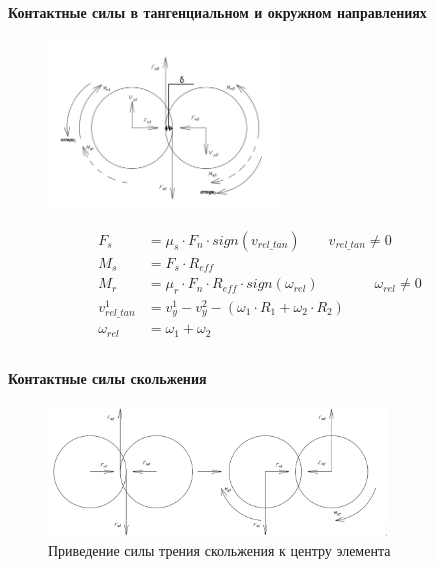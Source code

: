 \documentclass[c]{beamer}  %
\begin{document}
\begin{frame}
\frametitle{\insertsection} 
\framesubtitle{Контактные силы в тангенциальном и окружном направлениях}
\begin{figure}[h!]
	\centering
	\includegraphics[width=0.55\textwidth]{sily}
\end{figure} 
\begin{align*}
F_s &= \mu_s \cdot F_n \cdot sign(v_{rel\_tan}) \qquad v_{rel\_tan} \neq 0\\
M_s &= F_s \cdot R_{eff}\\
M_r &= \mu_r \cdot F_n \cdot R_{eff} \cdot sign(\omega_{rel}) \qquad \qquad \omega_{rel} \neq 0\\
v_{rel\_tan}^{1} &= v_{y}^{1} - v_{y}^{2} - \left( \omega_1 \cdot R_1 + \omega_2 \cdot R_2 \right)\\
\omega_{rel} &= \omega_1 + \omega_2\\
\end{align*}
\end{frame}





\begin{frame}
\frametitle{\insertsection} 
\framesubtitle{Контактные силы скольжения}

\begin{figure}[h!]
	\centering
	\includegraphics[width=0.8\textwidth]{fs_ms}
	\caption{Приведение силы трения скольжения к центру элемента}
	\label{pic:fs_ms}
\end{figure} 
\end{frame}
\end{document}
